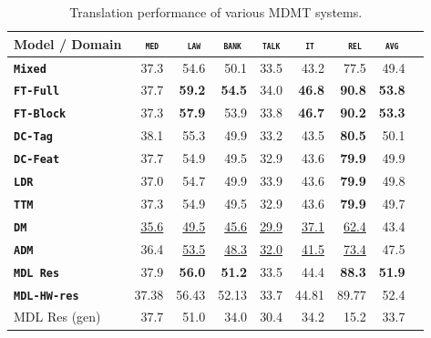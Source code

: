 \documentclass[11pt,a4paper]{article}
\newcommand{\fyDone}[1]{\done[FY]\Todo[FY:]{\textcolor{orange}{#1}}}
\newcommand{\domain}[1]{\texttt{\textsc{#1}}}
\newcommand{\system}[1]{\texttt{\textbf{#1}}}
\newcommand{\SB}[1]{\textbf{#1}}
\newcommand{\SW}[1]{\underline{#1}}
\begin{document}
\begin{table}[htbp]
  \centering
  \fyDone{Fix column size}
  \begin{tabular}{|p{3cm}|*{8}{r|}} \hline
    Model / Domain & \multicolumn{1}{c|}{\domain{ med}} & \multicolumn{1}{c|}{\domain{ law}} & \multicolumn{1}{c|}{\domain{bank}} & \multicolumn{1}{c|}{\domain{talk}} & \multicolumn{1}{c|}{\domain{ it }} & \multicolumn{1}{c|}{\domain{ rel}} & \multicolumn{1}{c|}{\domain{avg}} \\ \hline %
    \system{Mixed}  & 37.3 & 54.6 & 50.1 & 33.5 & 43.2 & 77.5  &  49.4 \\%
    \system{FT-Full}       & 37.7 & \SB{59.2} & \SB{54.5} & 34.0 & \SB{46.8} & \SB{90.8} &  \SB{53.8} \\
   \system{FT-Block}     & 37.3 & \SB{57.9} & 53.9 & 33.8 & \SB{46.7} & \SB{90.2}  &  \SB{53.3} \\ \hline 
    \system{DC-Tag}       & 38.1 & 55.3 & 49.9   & 33.2 & 43.5 & \SB{80.5}  & 50.1    \\
    \system{DC-Feat}      & 37.7  & 54.9 & 49.5   & 32.9 & 43.6 & \SB{79.9} & 49.9   \\
    \system{LDR}            & 37.0   & 54.7 & 49.9 & 33.9 & 43.6 & \SB{79.9} & 49.8          \\
    \system{TTM}            & 37.3 & 54.9 & 49.5 & 32.9 & 43.6 & \SB{79.9} & 49.7   \\
    \system{DM}             & \SW{35.6} & \SW{49.5}  & \SW{45.6}& \SW{29.9} & \SW{37.1} & \SW{62.4} & 43.4 \\ 
    \system{ADM}           & 36.4 & \SW{53.5}  & \SW{48.3} & \SW{32.0} & \SW{41.5} & \SW{73.4} & 47.5 \\
    \system{MDL Res}     & 37.9 & \SB{56.0}  & \SB{51.2}   & 33.5   &  44.4  & \SB{88.3} & \SB{51.9} \\
    \system{MDL-HW-res}   & 37.38&	56.43&	52.13&	33.7&	44.81&	89.77&	52.4 \\ 
    \hfill MDL Res (gen)    & 37.7 & 51.0 & 34.0 & 30.4 & 34.2 & 15.2 & 33.7\\
     \hline
  \end{tabular}
  \caption{Translation performance of various MDMT systems.}
  \label{tab:performance-multi}
\end{table}
\end{document}
